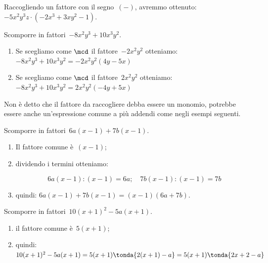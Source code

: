 
\begin{osservazione}{}{} 
Raccogliendo un fattore con il segno~\((-)\), avremmo 
ottenuto:~\(-5x^2y^{3}z \cdot (-2x^3+3xy^{2}-1)\).
\end{osservazione}

\begin{esempio}{}{}
Scomporre in fattori~\(-8x^2y^{3}+10x^3y^{2}\).
\begin{enumerate} [left=0mm, noitemsep]
\item  Se scegliamo come \(\mcd\) il fattore~\(-2x^2y^{2}\)
otteniamo: \\
\(-8x^2y^{3}+10x^3y^{2}=-2x^2y^{2}(4y-5x)\)
\item Se scegliamo come \(\mcd\) il fattore~\(2x^2y^{2}\)
otteniamo: \\
\(-8x^2y^{3}+10x^3y^{2}=2x^2y^{2}(-4y+5x)\)
\end{enumerate}
\end{esempio}

Non è detto che il fattore da raccogliere debba essere un monomio, 
potrebbe essere anche un'espressione comune a più addendi come 
negli esempi seguenti.

\begin{esempio}{}{}
Scomporre in fattori~\(6a(x-1)+7b(x-1)\).
\begin{enumerate} [left=0mm, noitemsep]
\item Il fattore comune è~\((x-1)\); 
\item dividendo i termini otteniamo:

\vspace{-1.2em}
\[6a(x-1):(x-1)=6a; \quad 7b(x-1):(x-1)=7b\]
\vspace{-1.6em}
\item quindi: \quad \(6a(x-1)+7b(x-1)=(x-1)(6a+7b)\).
\end{enumerate}
\end{esempio}

\begin{esempio}{}{}
Scomporre in fattori~\(10(x+1)^{2}-5a(x+1)\).
\begin{enumerate} [left=0mm, noitemsep]
\item il fattore comune è~\(5(x+1)\);
\item quindi: \\ 
\(10(x+1)^{2}-5a(x+1)=5(x+1)\tonda{2(x+1)-a}=5(x+1)\tonda{2x+2-a}\)
\end{enumerate}
\end{esempio}


